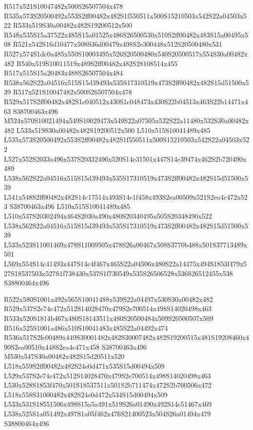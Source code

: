 \documentclass{article}
\begin{document}
\begin{multicols}{2}
R517x521S10047482x500S26507504x478 R535x573S20500492x553S2ff00482x482S1f550511x500S15210503x542S22a04503x522 R533x519S30a00482x482S19200512x500 R548x535S15a37522x485S15a01525x486S26500530x510S2ff00482x483S15a00495x508 R521x542S16d10477x508S36d00479x498S2e300448x512S20500480x531 R527x574S1dc0a485x550S10003495x526S20500480x540S20500517x554S30a00482x482 R540x519S10011519x489S2ff00482x482S28108514x455 R517x515S15a20483x488S26507504x484 R538x562S22a04516x515S15d39493x535S17310519x473S2ff00482x482S15d51500x539 R517x521S10047482x500S26507504x478 R529x517S2ff00482x482S1c040512x430S1c048473x430S22b04513x463S22b14471x463 S38700463x496 M524x570S10021494x549S10029473x549S22a07505x532S22a11480x532S30a00482x482 L533x519S30a00482x482S19200512x500 L510x515S10041489x485 L535x573S20500492x553S2ff00482x482S1f550511x500S15210503x542S22a04503x522 L527x552S2033a496x537S20332496x520S14c31501x447S14c39474x462S2b720490x489 L538x562S22a04516x515S15d39493x535S17310519x473S2ff00482x482S15d51500x539 L541x548S2ff00482x482S14c17514x493S14c1f458x493S2ea00509x521S2ea4c472x523 S38700463x496 L510x515S10041489x485 L510x537S20302494x464S2030a490x480S20340495x505S20348490x522 L538x562S22a04516x515S15d39493x535S17310519x473S2ff00482x482S15d51500x539 L533x523S11001469x478S11009505x478S26a00467x508S3770b488x501S37713489x501 L569x554S14c41493x447S14c4f467x465S22a04506x480S22a14475x494S1853f479x527S18537503x527S1f738430x537S1f730549x535S26506528x536S26512455x538 S38800464x496

R522x580S1001a492x565S10041488x539S22a04497x530S30a00482x482 R529x537S2e74c472x512S14028470x479S2e700514x498S14020498x463 R533x520S1814b467x480S18143511x480S20500484x509S20500507x509 R516x525S1001a486x510S10041483x485S22a04492x474 R536x517S2fc00489x449S30001482x482S30007482x482S19200515x481S19208460x490S2ea00510x448S2ea4c471x458 S38700463x496 M530x547S30a00482x482S15d20511x520 L518x559S2ff00482x482S24e0d471x535S15d00494x509 L529x537S2e74c472x512S14028470x479S2e700514x498S14020498x463 L530x528S1853f470x501S18537511x501S2b711474x472S2b700506x472 L518x558S31000482x482S24e0d472x534S15d00494x509 L533x531S18551506x498S15a5a491x519S26a01490x492S14c51467x469 L538x525S1a051492x497S1a05f462x476S21400523x504S26a01494x479 S38800464x496


\end{multicols}
\end{document}
